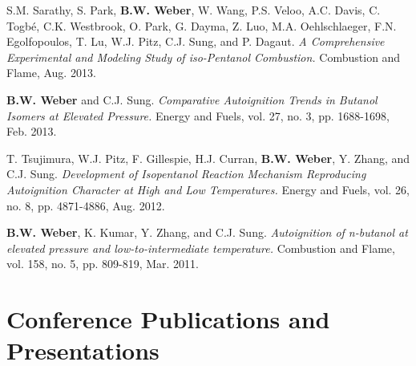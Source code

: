 \begin{bibsection}
\item[] S.M. Sarathy, S. Park, \textbf{B.W. Weber}, W. Wang,
        P.S. Veloo, A.C. Davis, C. Togbé, C.K. Westbrook, O. Park,
        G. Dayma, Z. Luo, M.A. Oehlschlaeger, F.N. Egolfopoulos,
        T. Lu, W.J. Pitz, C.J. Sung, and P. Dagaut. \textit{A 
        Comprehensive Experimental and Modeling Study of iso-Pentanol 
        Combustion.} Combustion and Flame, Aug. 2013. \\
        
\item[] \textbf{B.W. Weber} and C.J. Sung. \textit{Comparative
        Autoignition Trends in Butanol Isomers at Elevated Pressure.}
        Energy and Fuels, vol. 27, no. 3, pp. 1688-1698, Feb. 2013. \\
        
\item[] T. Tsujimura, W.J. Pitz, F. Gillespie, H.J. Curran,
        \textbf{B.W. Weber}, Y. Zhang, and C.J. Sung.
        \textit{Development of Isopentanol Reaction Mechanism
        Reproducing Autoignition Character at High and Low
        Temperatures.} Energy and Fuels, vol. 26, no. 8, pp. 4871-4886,
        Aug. 2012. 
        
\item[] \textbf{B.W. Weber}, K. Kumar, Y. Zhang, and C.J. Sung.
        \textit{Autoignition of n-butanol at elevated pressure and
        low-to-intermediate temperature.} Combustion and Flame,
        vol. 158, no. 5, pp. 809-819, Mar. 2011.
\end{bibsection}


\section{Conference Publications and Presentations}

